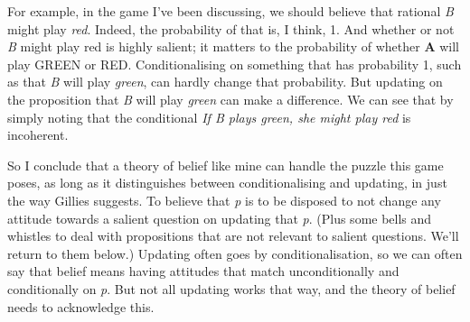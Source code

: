 For example, in the game I've been discussing, we should believe that rational \textit{B} might play \textit{red}. Indeed, the probability of that is, I think, 1. And whether or not \textit{B} might play red is highly salient; it matters to the probability of whether \textbf{A} will play GREEN or RED. Conditionalising on something that has probability 1, such as that \textit{B} will play \textit{green}, can hardly change that probability. But updating on the proposition that \textit{B} will play \textit{green} can make a difference. We can see that by simply noting that the conditional \textit{If B plays green, she might play red} is incoherent.

So I conclude that a theory of belief like mine can handle the puzzle this game poses, as long as it distinguishes between conditionalising and updating, in just the way Gillies suggests. To believe that \textit{p} is to be disposed to not change any attitude towards a salient question on updating that \textit{p}. (Plus some bells and whistles to deal with propositions that are not relevant to salient questions. We'll return to them below.) Updating often goes by conditionalisation, so we can often say that belief means having attitudes that match unconditionally and conditionally on \textit{p}. But not all updating works that way, and the theory of belief needs to acknowledge this.

